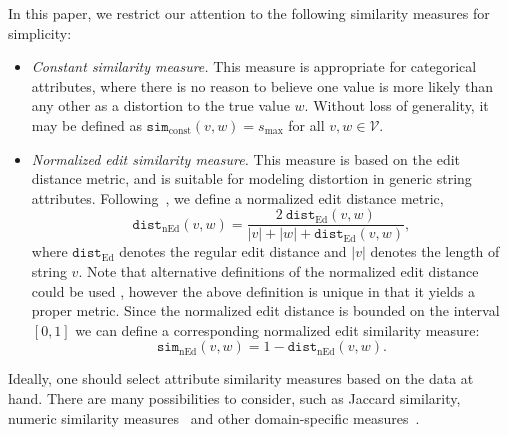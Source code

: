 \documentclass[12pt,letterpaper]{article}
\newcommand{\simfn}{\mathtt{sim}} %
\newcommand{\distfn}{\mathtt{dist}} %
\newcommand{\valset}{\mathcal{V}} %
\newcommand{\1}[1]{\mathbb{I}\!\left[#1\right]} %
\begin{document}
In this paper, we restrict our attention to the following 
similarity measures for simplicity:
\begin{itemize}
  \item \emph{Constant similarity measure.} This measure 
  is appropriate for categorical attributes, where there is 
  no reason to believe one value is more likely than any 
  other as a distortion to the true value $w$.
  Without loss of generality, it may be defined as 
  $\simfn_\mathrm{const}(v, w) = s_\mathrm{max}$ for all 
  $v, w \in \valset$.
  \item \emph{Normalized edit similarity measure.} 
  This measure is based on the edit distance metric, and is 
  suitable for modeling distortion in generic string attributes.
  Following~\cite{yujian_normalized_2007}, we define a normalized 
  edit distance metric,
  \begin{equation*}
    \distfn_{\mathrm{nEd}}(v,w) = \frac{2\ \distfn_{\mathrm{Ed}}(v,w)}
    {|v| + |w| + \distfn_{\mathrm{Ed}}(v,w)},
  \end{equation*}
  where $\distfn_{\mathrm{Ed}}$ denotes the regular edit distance 
  and $|v|$ denotes the length of string $v$.
  Note that alternative definitions of the normalized edit distance 
  could be used \citep[see references in][]{yujian_normalized_2007}, 
  however the above definition is unique in that it yields a 
  proper metric.
  Since the normalized edit distance is bounded on the interval 
  $[0,1]$ we can define a corresponding normalized edit similarity 
  measure:
  \begin{equation}
    \simfn_{\mathrm{nEd}}(v, w) = 1 - \distfn_{\mathrm{nEd}}(v, w).
  \label{eqn:norm-edit-sim-fn}
  \end{equation}
\end{itemize}
Ideally, one should select attribute similarity measures based on 
the data at hand.
There are many possibilities to consider, such as  
Jaccard similarity, numeric similarity 
measures~\citep{lesot_similarity_2008} and other 
domain-specific measures~\citep{bilenko_adaptive_2003}.
\end{document}
